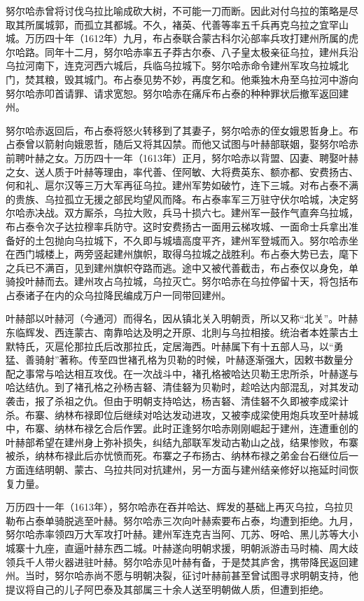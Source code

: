 努尔哈赤曾将讨伐乌拉比喻成砍大树，不可能一刀而断。因此对付乌拉的策略是尽取其所属城郭，而孤立其都城。不久，褚英、代善等率五千兵再克乌拉之宜罕山城。万历四十年（1612年）九月，布占泰联合蒙古科尔沁部率兵攻打建州所属的虎尔哈路。同年十二月，努尔哈赤率五子莽古尔泰、八子皇太极亲征乌拉，建州兵沿乌拉河南下，连克河西六城后，兵临乌拉城下。努尔哈赤命令建州军攻乌拉城北门，焚其粮，毁其城门。布占泰见势不妙，再度乞和。他乘独木舟至乌拉河中游向努尔哈赤叩首请罪、请求宽恕。努尔哈赤在痛斥布占泰的种种罪状后撤军返回建州。

努尔哈赤返回后，布占泰将怒火转移到了其妻子，努尔哈赤的侄女娥恩哲身上。布占泰曾以箭射向娥恩哲，随后又将其囚禁。而他又试图与叶赫部联姻，娶努尔哈赤前聘叶赫之女。万历四十一年（1613年）正月，努尔哈赤以背盟、囚妻、聘娶叶赫之女、送人质于叶赫等理由，率代善、侄阿敏、大将费英东、额亦都、安费扬古、何和礼、扈尔汉等三万大军再征乌拉。建州军势如破竹，连下三城。对布占泰不满的贵族、乌拉孤立无援之部民均望风而降。布占泰率军三万驻守伏尔哈城，决定努尔哈赤决战。双方厮杀，乌拉大败，兵马十损六七。建州军一鼓作气直奔乌拉城，布占泰令次子达拉穆率兵防守。这时安费扬古一面用云梯攻城、一面命士兵拿出准备好的土包抛向乌拉城下，不久即与城墙高度平齐，建州军登城而入。努尔哈赤坐在西门城楼上，两旁竖起建州旗帜，取得乌拉城之战胜利。布占泰大势已去，麾下之兵已不满百，见到建州旗帜夺路而逃。途中又被代善截击，布占泰仅以身免，单骑投叶赫而去。建州攻占乌拉城，乌拉灭亡。努尔哈赤在乌拉停留十天，将包括布占泰诸子在内的众乌拉降民编成万户一同带回建州。

叶赫部以叶赫河（今通河）而得名，因从镇北关入明朝贡，所以又称“北关”。叶赫东临辉发、西连蒙古、南靠哈达及明之开原、北則与乌拉相接。统治者本姓蒙古土默特氏，灭扈伦那拉氏后改那拉氏，定居海西。叶赫属下有十五部人马，以“勇猛、善骑射”著称。传至四世褚孔格为贝勒的时候，叶赫逐渐强大，因敕书数量分配之事常与哈达相互攻伐。在一次战斗中，褚孔格被哈达贝勒王忠所杀，叶赫遂与哈达结仇。到了褚孔格之孙杨吉砮、清佳砮为贝勒时，趁哈达内部混乱，对其发动袭击，报了杀祖之仇。但由于明朝支持哈达，杨吉砮、清佳砮不久即被李成梁计杀。布寨、纳林布禄即位后继续对哈达发动进攻，又被李成梁使用炮兵攻至叶赫城中，布寨、纳林布禄乞合后作罢。此时正逢努尔哈赤刚刚崛起于建州，连遭重创的叶赫部希望在建州身上弥补损失，纠结九部联军发动古勒山之战，结果惨败，布寨被杀，纳林布禄此后亦忧愤而死。布寨之子布扬古、纳林布禄之弟金台石继位后一方面连结明朝、蒙古、乌拉共同对抗建州，另一方面与建州结亲修好以拖延时间恢复力量。

万历四十一年（1613年），努尔哈赤在吞并哈达、辉发的基础上再灭乌拉，乌拉贝勒布占泰单骑脱逃至叶赫。努尔哈赤三次向叶赫索要布占泰，均遭到拒绝。九月，努尔哈赤率领四万大军攻打叶赫。建州军连克吉当阿、兀苏、呀哈、黑儿苏等大小城寨十九座，直逼叶赫东西二城。叶赫遂向明朝求援，明朝派游击马时楠、周大歧领兵千人带火器进驻叶赫。努尔哈赤见叶赫有备，于是焚其庐舍，携带降民返回建州。当时，努尔哈赤尚不愿与明朝决裂，征讨叶赫前甚至曾试图寻求明朝支持，他提议将自己的儿子阿巴泰及其部属三十余人送至明朝做人质，但遭到拒绝。

